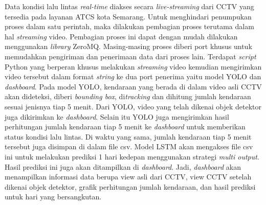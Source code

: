 \documentclass[../thesis.tex]{subfiles}
\begin{document}
Data kondisi lalu lintas \textit{real-time} diakses secara \textit{live-streaming} dari CCTV yang tersedia pada layanan ATCS kota Semarang. Untuk menghindari penumpukan proses dalam satu perintah, maka dilakukan pembagian proses terutama dalam hal \textit{streaming} video.
Pembagian proses ini dapat dengan mudah dilakukan menggunakan \textit{library} ZeroMQ. Masing-masing proses diberi port khusus untuk memudahkan pengiriman dan penerimaan data dari proses lain.
Terdapat \textit{script} Python yang berperan khusus melakukan \textit{streaming} video kemudian mengirimkan video tersebut dalam format \textit{string} ke dua port penerima yaitu model YOLO dan \textit{dashboard}. Pada model YOLO, kendaraan yang berada di dalam video asli CCTV akan dideteksi, diberi \textit{bounding box}, di\textit{tracking} dan dihitung jumlah kendaraan sesuai jenisnya tiap 5 menit.
Dari YOLO, video yang telah dikenai objek detektor juga dikirimkan ke \textit{dashboard}. Selain itu YOLO juga mengirimkan hasil perhitungan jumlah kendaraan tiap 5 menit ke \textit{dashboard} untuk memberikan status kondisi lalu lintas. Di waktu yang sama, jumlah kendaraan tiap 5 menit tersebut juga disimpan di dalam file csv. 
Model LSTM akan mengakses file csv ini untuk melakukan prediksi 1 hari kedepan menggunakan strategi \textit{multi output}. Hasil prediksi ini juga akan ditampilkan di \textit{dashboard}.
Jadi, \textit{dashboard} akan menampilkan informasi data berupa view asli dari CCTV, view CCTV setelah dikenai objek detektor, grafik perhitungan jumlah kendaraan, dan hasil prediksi untuk hari yang bersangkutan.
\end{document}
